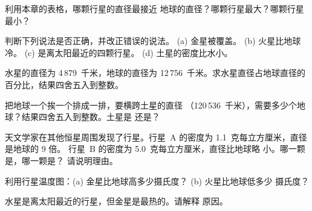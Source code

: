 \begin{exercise}[$\star$]\label{exo:g6:earth-a-planet:3}
利用本章的表格，哪颗行星的直径最接近
地球的直径？哪颗行星最大？哪颗行星最小？
\end{exercise}

\begin{exercise}[$\star$]\label{exo:g6:earth-a-planet:4}
判断下列说法是否正确，并改正错误的说法。
(a) 金星被覆盖。
(b) 火星比地球冷。
(c) 是离太阳最近的四颗行星。
(d) 土星的密度比水小。
\end{exercise}

\begin{exercise}[$\star\star$]\label{exo:g6:earth-a-planet:5}
水星的直径为 4\,879~千米，地球的直径为
12\,756~千米。求水星直径占地球直径的
百分比，结果四舍五入到整数。
\end{exercise}

\begin{exercise}[$\star\star$]\label{exo:g6:earth-a-planet:6}
把地球一个挨一个排成一排，要横跨土星的直径
（120\,536~千米），需要多少个地球？结果四舍五入到整数。土星是
还是？
\end{exercise}

\begin{exercise}[$\star\star$]\label{exo:g6:earth-a-planet:7}
天文学家在其他恒星周围发现了行星。行星~A 的密度为
1.1~克每立方厘米，直径是地球的 9 倍。
行星~B 的密度为 5.0~克每立方厘米，直径比地球略
小。哪一颗是，哪一颗是？
请说明理由。
\end{exercise}

\begin{exercise}[$\star\star$]\label{exo:g6:earth-a-planet:8}
利用行星温度图：(a) 金星比地球高多少摄氏度？
(b) 火星比地球低多少
摄氏度？
\end{exercise}

\begin{exercise}[$\star\star$]\label{exo:g6:earth-a-planet:9}
水星是离太阳最近的行星，但金星是最热的。请解释
原因。
\end{exercise}

